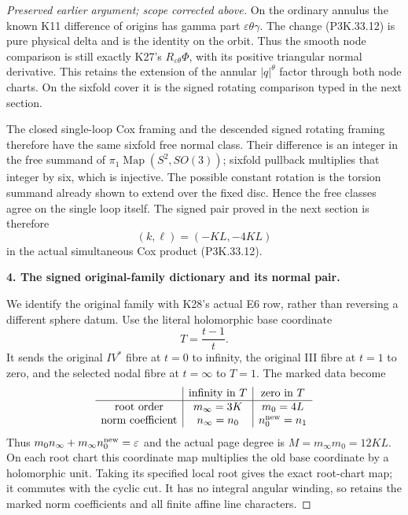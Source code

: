 \begin{proof}[Preserved earlier argument; scope corrected above]
On the ordinary annulus the known K11 difference of origins
has gamma part \(\varepsilon\theta\gamma\). The change (P3K.33.12) is pure
physical delta and is the identity on the orbit. Thus the
smooth node comparison is still exactly K27's
\(R_{\varepsilon\theta}\Phi\), with its positive triangular normal
derivative. This retains the extension of the annular
\(|q|^\theta\) factor through both node charts. On the
sixfold cover it is the signed rotating comparison typed in the
next section.

The closed single-loop Cox framing and the descended signed rotating
framing therefore have the same sixfold free normal class.
Their difference is an integer in the free summand of
\(\pi_1\operatorname{Map}(S^2,SO(3))\); sixfold pullback
multiplies that integer by six, which is injective. The possible
constant rotation is the torsion summand already shown to extend
over the fixed disc. Hence the free classes agree on the single
loop itself. The signed pair proved in the next section is therefore
\[
                       (k,\ell)=(-KL,-4KL)
\]
in the actual simultaneous Cox product (P3K.33.12).

\par\medskip\noindent\textbf{4. The signed original-family dictionary and its normal pair.}\enspace

We identify the original family with K28's actual E6 row, rather
than reversing a different sphere datum. Use the literal holomorphic
base coordinate
\[
             T=\frac{t-1}{t}.
\]
It sends the original \(IV^*\) fibre at \(t=0\) to infinity,
the original III fibre at \(t=1\) to zero, and the selected nodal
fibre at \(t=\infty\) to \(T=1\). The marked data become
\[
\begin{array}{c|c|c}
 &\text{infinity in }T&\text{zero in }T\\\hline
 \text{root order}&m_\infty=3K&m_0=4L\\
 \text{norm coefficient}&n_\infty=n_0&n_0^{\rm new}=n_1
\end{array}
\]
Thus \(m_0n_\infty+m_\infty n_0^{\rm new}=\varepsilon\)
and the actual page degree is \(M=m_\infty m_0=12KL\).
On each root chart this coordinate map multiplies the old base
coordinate by a holomorphic unit. Taking its specified local root
gives the exact root-chart map; it commutes with the cyclic cut.
It has no integral angular winding, so retains the marked norm
coefficients and all finite affine line characters.


\end{proof}
